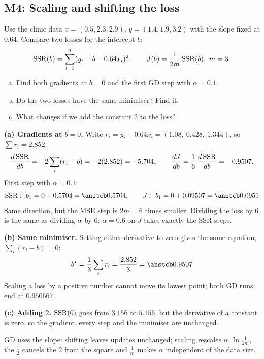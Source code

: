 \subsection{M4: Scaling and shifting the loss}

\begin{frame}{}
  \begin{probbox}
    Use the clinic data $x = (0.5, 2.3, 2.9)$, $y = (1.4, 1.9, 3.2)$ with the slope fixed at $0.64$.
    Compare two losses for the intercept $b$:
    \[
      \mathrm{SSR}(b) = \sum_{i=1}^{3}(y_i - b - 0.64x_i)^2, \qquad J(b) = \frac{1}{2m}\,\mathrm{SSR}(b),\ m = 3 .
    \]
    \begin{enumerate}[(a)]
      \item Find both gradients at $b = 0$ and the first GD step with $\alpha = 0.1$.
      \item Do the two losses have the same minimiser? Find it.
      \item What changes if we add the constant $2$ to the loss?
    \end{enumerate}
  \end{probbox}
\end{frame}

\begin{frame}{}
  \textbf{(a) Gradients at $b = 0$.} Write $r_i = y_i - 0.64x_i = (1.08,\ 0.428,\ 1.344)$, so $\sum r_i = 2.852$.
  \[
    \frac{d\,\mathrm{SSR}}{db} = -2\sum_i (r_i - b) = -2(2.852) = -5.704,
    \qquad
    \frac{dJ}{db} = \frac{1}{6}\,\frac{d\,\mathrm{SSR}}{db} = -0.9507 .
  \]
  First step with $\alpha = 0.1$:
  \[
    \SSR:\ b_1 = 0 + 0.5704 = \ans{0.5704}, \qquad J:\ b_1 = 0 + 0.09507 = \ans{0.0951}
  \]
  Same direction, but the MSE step is $2m = 6$ times smaller. Dividing the loss by $6$ is the same as dividing
  $\alpha$ by $6$: $\alpha = 0.6$ on $J$ takes exactly the SSR steps.
\end{frame}

\begin{frame}{}
  \textbf{(b) Same minimiser.} Setting either derivative to zero gives the same equation, $\sum_i (r_i - b) = 0$:
  \[
    b^\star = \frac{1}{3}\sum_i r_i = \frac{2.852}{3} = \ans{0.9507}
  \]
  Scaling a loss by a positive number cannot move its lowest point; both GD runs end at $0.950667$.

  \textbf{(c) Adding $2$.} $\mathrm{SSR}(0)$ goes from $3.156$ to $5.156$, but the derivative of a constant is zero, so the
  gradient, every step and the minimiser are \alert{unchanged}.
  \begin{keybox}
    \small GD uses the slope: shifting leaves updates unchanged; scaling rescales $\alpha$.
    In $\tfrac{1}{2m}$, the $\tfrac12$ cancels the $2$ from the square and $\tfrac1m$ makes $\alpha$ independent of the data size.
  \end{keybox}
\end{frame}
